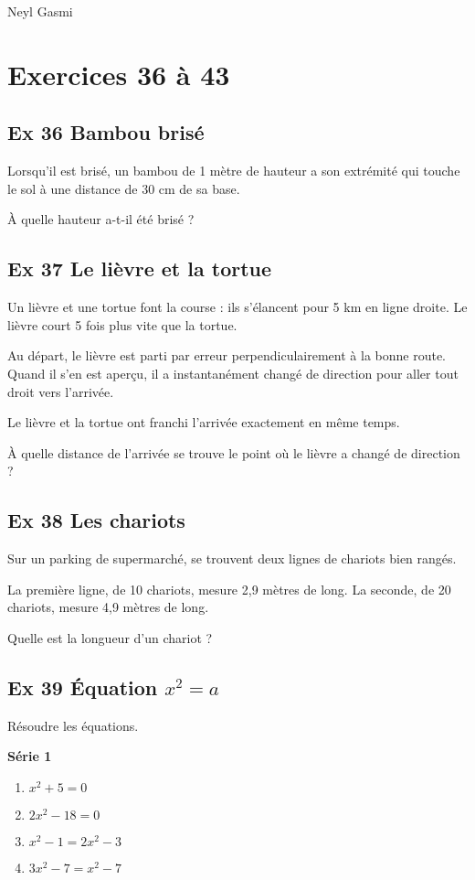\documentclass[12pt,a4paper]{article}
\begin{document}
Neyl Gasmi

\section*{Exercices 36 à 43}

\subsection*{Ex 36 \; Bambou brisé}
Lorsqu’il est brisé, un bambou de 1 mètre de hauteur a son extrémité qui touche le sol à une distance de 30 cm de sa base.

\medskip
À quelle hauteur a-t-il été brisé ?

\bigskip

\subsection*{Ex 37 \; Le lièvre et la tortue}
Un lièvre et une tortue font la course : ils s’élancent pour 5 km en ligne droite.  
Le lièvre court 5 fois plus vite que la tortue.

Au départ, le lièvre est parti par erreur perpendiculairement à la bonne route.  
Quand il s’en est aperçu, il a instantanément changé de direction pour aller tout droit vers l’arrivée.

Le lièvre et la tortue ont franchi l’arrivée exactement en même temps.  

\medskip
À quelle distance de l’arrivée se trouve le point où le lièvre a changé de direction ?

\bigskip

\subsection*{Ex 38 \; Les chariots}
Sur un parking de supermarché, se trouvent deux lignes de chariots bien rangés.

La première ligne, de 10 chariots, mesure 2,9 mètres de long.  
La seconde, de 20 chariots, mesure 4,9 mètres de long.  

\medskip
Quelle est la longueur d’un chariot ?

\bigskip

\subsection*{Ex 39 \; Équation \(x^2=a\)}
Résoudre les équations.

\textbf{Série 1}
\begin{enumerate}
  \item \(x^2 + 5 = 0\)
  \item \(2x^2 - 18 = 0\)
  \item \(x^2 - 1 = 2x^2 - 3\)
  \item \(3x^2 - 7 = x^2 - 7\)
\end{enumerate}
\end{document}
